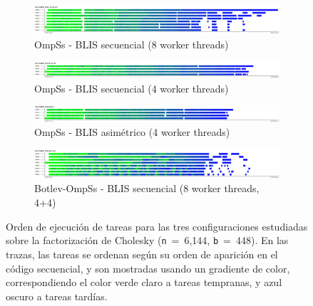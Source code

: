 \begin{figure}%
\centering
	\begin{subfigure}{\textwidth}
   \includegraphics[width=\textwidth]{Plots/Traces/sym_8cores_task_number.png}
		\caption{OmpSs - BLIS secuencial (8 worker threads)}
	\end{subfigure}
	\begin{subfigure}{\textwidth}
   \includegraphics[width=\textwidth]{Plots/Traces/sym_task_number.png}
		\caption{OmpSs - BLIS secuencial (4 worker threads)} 
	\end{subfigure}
	\begin{subfigure}{\textwidth}
   \includegraphics[width=\textwidth]{Plots/Traces/asym_task_number.png}
		\caption{OmpSs - BLIS asimétrico (4 worker threads)} 
	\end{subfigure}
	\begin{subfigure}{\textwidth}
   \includegraphics[width=\textwidth]{Plots/Traces/botlev_task_number.png}
		\caption{Botlev-OmpSs - BLIS secuencial (8 worker threads, 4+4)} 
	\end{subfigure}
\caption{Orden de ejecución de tareas para las tres configuraciones estudiadas sobre la factorización de Cholesky
({\tt n}~=~6,144, {\tt b}~=~448). En las trazas, las tareas se ordenan según su orden de aparición
en el código secuencial, y son mostradas usando un gradiente de color, correspondiendo el color verde claro a tareas
	tempranas, y azul oscuro a tareas tardías.}
\label{fig:traces_task_number}
\end{figure}

